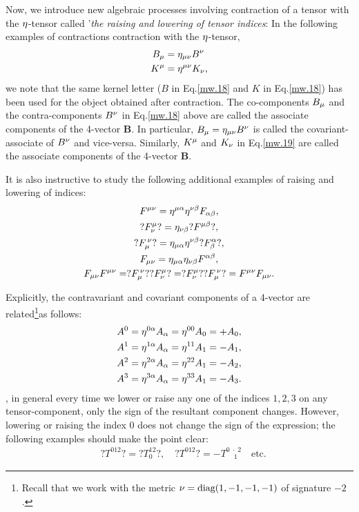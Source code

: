 Now, we introduce new algebraic processes involving 
contraction of a tensor with the  ${\eta}$-tensor called 
'\textsl{the raising and lowering of tensor indices}: 
In the following examples of contractions contraction 
with the ${\eta}$-tensor, 
\begin{align}\label{mw.18}
B_{{\mu}}& ={\eta}_{{\mu}{\nu}}B^{{\nu}} \\ {K}^{{\mu}}
& ={\eta}^{{\mu}{\nu}}{K}_{{\nu}},\label{mw.19}
\end{align}
we note that the same kernel letter ($B$ in  
Eq.\eqref{mw.18} and $K$ in Eq.\break\eqref{mw.18}) has been 
used for the object obtained after contraction. The 
co-components $B_{{\mu}}$ and the contra-components 
$B^{{\nu}}$ in  Eq.\eqref{mw.18} above are called the 
associate components of the 4-vector $\textbf{B}$. In 
particular,  $B_{{\mu}}={\eta}_{{\mu}{\nu}}B^{{\nu}}$ is   
called the covariant-associate of $B^{{\nu}}$ 
and vice-versa. Similarly, $K^{{\mu}}$ and 
$K_{{\nu}}$ in  Eq.\eqref{mw.19} are called the associate 
components of the 4-vector $\textbf{B}$.

It is also instructive to study the following 
additional examples of raising and lowering of indices:
\begin{gather*}
F^{{\mu}{\nu}}={\eta}^{{\mu}{\alpha}}{\eta}^{{\nu}{\beta}}F_{ 
{\alpha}{\beta}}, \\
?F^{{\mu}}_{{\nu}}?={\eta}_{{\nu}{\beta}}?F^{{\mu}{\beta}}?, \\
?F_{{\mu}}^{\,{\nu}}?={\eta}_{{\mu}{\alpha}}{\eta}^{{\nu}{\beta}}
?F^{{\alpha}}_{{\beta}}?, \\
F_{{\mu}{\nu}}={\eta}_{{\mu}{\alpha}}{\eta}_{{\nu}{\beta}}F^{
{\alpha}{\beta}},\\
F_{{\mu}{\nu}}F^{{\mu}{\nu}}= ?F_{{\mu}}^{\,{\nu}}?
?F^{{\mu}}_{{\nu}}?=?F^{{\mu}}_{{\nu}}??F_{{\mu}}^{\,{\nu}}
?=F^{{\mu}{\nu}}F_{{\mu}{\nu}}.
\end{gather*}

Explicitly, the contravariant and covariant components 
of a 4-vector are related\footnote{Recall that we work 
with the metric ${\nu}=\mbox{diag}(1,-1,-1,-1)$ of signature 
$-2$.}as follows:
\begin{align}\label{mw.20}
&A^0 ={\eta}^{0{\alpha}}A_{{\alpha}}={\eta}^{00}A_0=+A_0,\notag\\
&A^1 ={\eta}^{1{\alpha}}A_{{\alpha}}={\eta}^{11}A_1=-A_1,\notag\\ 
&A^2 ={\eta}^{2{\alpha}}A_{{\alpha}}={\eta}^{22}A_1=-A_2,\notag\\ 
&A^3 ={\eta}^{3{\alpha}}A_{{\alpha}}={\eta}^{33}A_1=-A_3.
\end{align}
\ie, in general every time we lower or raise any one of 
the indices $1,2,3$ on any tensor-component, only 
the sign of the resultant component changes. However, 
lowering or raising the index $0$ does not change the 
sign of the expression; the following examples should 
make the point clear:
\begin{align*}
& ?T^{012}?=?T_{0 }^{12}? ,\quad
?T^{012}?=-T^{0 \;\cdot\; 2}_{\; \;\;\;1\;}\quad 
\text{etc}.
\end{align*}

